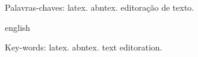 
\begin{resumo}
\noindent
\lipsum[1-1] %

    
 
 Palavras-chaves: latex. abntex. editoração de texto.
\end{resumo}

\begin{resumo}[Abstract]	
 	\begin{otherlanguage*}{english}
 	\noindent 
	\textit{
	\lipsum[1-1]  %
	} 
 
   
    Key-words: latex. abntex. text editoration.	
 	\end{otherlanguage*}
\end{resumo}